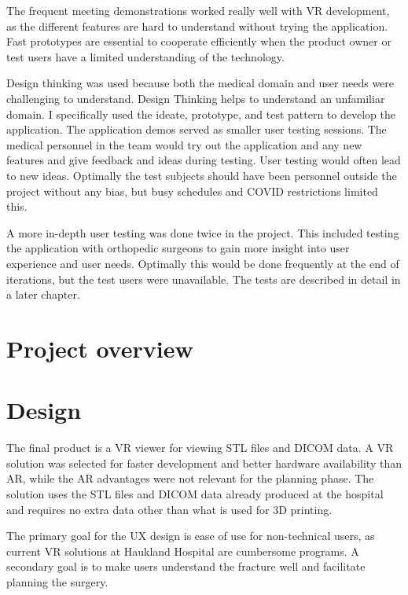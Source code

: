\documentclass[a4paper]{report}
\begin{document}
The frequent meeting demonstrations worked really well with VR development, as the different features are hard to understand without trying the application. Fast prototypes are essential to cooperate efficiently when the product owner or test users have a limited understanding of the technology.


Design thinking was used because both the medical domain and user needs were challenging to understand. Design Thinking helps to understand an unfamiliar domain. I specifically used the ideate, prototype, and test pattern to develop the application.
The application demos served as smaller user testing sessions. The medical personnel in the team would try out the application and any new features and give feedback and ideas during testing. User testing would often lead to new ideas. Optimally the test subjects should have been personnel outside the project without any bias, but busy schedules and COVID restrictions limited this.

A more in-depth user testing was done twice in the project. This included testing the application with orthopedic surgeons to gain more insight into user experience and user needs. Optimally this would be done frequently at the end of iterations, but the test users were unavailable. The tests are described in detail in a later chapter.

\section{Project overview}\label{CodeStructure}

\section{Design}


The final product is a VR viewer for viewing STL files and DICOM data. A VR solution was selected for faster development and better hardware availability than AR, while the AR advantages were not relevant for the planning phase.
The solution uses the STL files and DICOM data already produced at the hospital and requires no extra data other than what is used for 3D printing.

The primary goal for the UX design is ease of use for non-technical users, as current VR solutions at Haukland Hospital are cumbersome programs.
A secondary goal is to make users understand the fracture well and facilitate planning the surgery.
\end{document}
